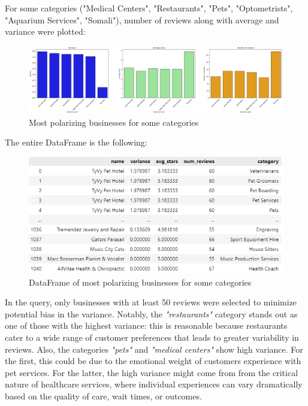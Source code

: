 \documentclass{Configuration_Files/PoliMi3i_thesis}
\begin{document}
\bigskip

For some categories ("Medical Centers", "Restaurants", "Pets", "Optometrists", "Aquarium Services", "Somali"), number of reviews along with average and variance were plotted:

\bigskip

\begin{figure}[H]
    \centering
    \includegraphics[width=\columnwidth]{imgs/most_polarizing_businesses.png}
    \caption{Most polarizing businesses for some categories}
    \label{fig:most_polarizing_businesses}
\end{figure}

\bigskip

The entire DataFrame is the following:

\bigskip

\begin{figure}[H]
    \centering
    \includegraphics[width=\columnwidth]{imgs/most_polarizing_businesses_table.png}
    \caption{DataFrame of most polarizing businesses for some categories}
    \label{fig:most_polarizing_businesses_table}
\end{figure}

\bigskip

In the query, only businesses with at least 50 reviews were selected to minimize potential bias in the variance. Notably, the \textit{"restaurants"} category stands out as one of those with the highest variance: this is reasonable because restaurants cater to a wide range of customer preferences that leads to greater variability in reviews. Also, the categories \textit{"pets"} and \textit{"medical centers"} show high variance. For the first, this could be due to the emotional weight of customers experience with pet services. For the latter, the high variance might come from from the critical nature of healthcare services, where individual experiences can vary dramatically based on the quality of care, wait times, or outcomes.
\end{document}
